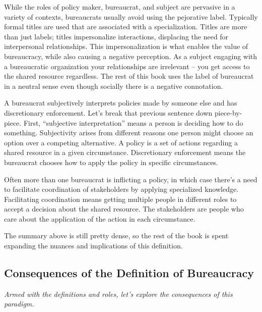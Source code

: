 While the roles of policy maker, bureaucrat, and subject are pervasive in a variety of contexts, bureaucrats usually avoid using the pejorative label. Typically formal titles are used that are associated with a specialization. Titles are more than just labels; titles impersonalize interactions, displacing the need for interpersonal relationships. This impersonalization is what enables the value of bureaucracy, while also causing a negative perception. As a subject engaging with a bureaucratic organization your relationships are irrelevant -- you get access to the shared resource regardless. The rest of this book uses the label of bureaucrat in a neutral sense even though socially there is a negative connotation.  

A \gls{bureaucrat} \iftoggle{glossaryinmargin}{\marginpar{[Glossary]}}{}%
subjectively interprets policies made by someone else and has discretionary enforcement.  
Let's break that previous sentence down piece-by-piece. First, ``subjective interpretation'' means a person is deciding how to do something. Subjectivity arises from different reasons one person might choose an option over a competing alternative.  A \gls{policy} \iftoggle{glossaryinmargin}{\marginpar{[Glossary]}}{}%
is a set of actions regarding a shared resource in a given circumstance. 
Discretionary enforcement means the bureaucrat chooses how to apply the policy in specific circumstances. 

Often more than one bureaucrat is inflicting a policy, in which case there's a need to facilitate coordination of stakeholders by applying specialized knowledge. 
Facilitating coordination means getting multiple people in different roles
to accept a decision about the shared resource. The stakeholders are people who care about the application of the action in each circumstance.  


The summary above is still pretty dense, so the rest of the book is spent expanding the nuances and implications of this definition.

\subsection*{Consequences of the Definition of Bureaucracy}

\textit{Armed with the definitions and roles, let's explore the consequences of this paradigm.}


